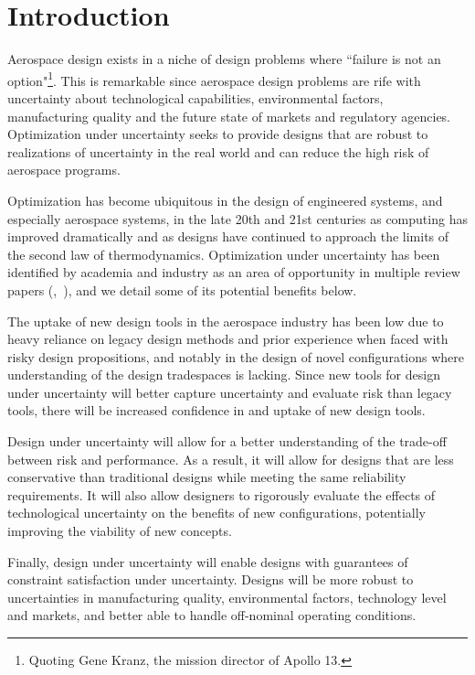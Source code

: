\section{Introduction}

Aerospace design exists in a niche of design problems where ``failure is
not an option"\footnote{Quoting Gene Kranz, the mission director of Apollo 13.}.
This is remarkable since aerospace design problems are rife with uncertainty about
technological capabilities, environmental factors, manufacturing quality and the future
state of markets and regulatory agencies.
Optimization under uncertainty seeks to provide designs that are robust
to realizations of uncertainty in the real world and can reduce
the high risk of aerospace programs.

Optimization has become ubiquitous in the design of engineered systems, and especially aerospace systems,
in the late 20th and 21st centuries as computing has improved dramatically and as designs have
continued to approach the limits of the second law of thermodynamics. Optimization under uncertainty
has been identified by academia and industry as an area of opportunity
in multiple review papers (\cite{Zang2002},~\cite{Yao2011}),
and we detail some of its potential benefits below.

{\color{blue} The uptake of new design tools in the aerospace industry has been low
due to heavy reliance on legacy design methods and prior experience when
faced with risky design propositions, and notably in
the design of novel configurations where understanding
of the design tradespaces is lacking. Since new tools for design under uncertainty
will better capture uncertainty and evaluate risk than legacy tools,
there will be increased confidence in and uptake of new design tools.

Design under uncertainty will allow for a better understanding of the trade-off between risk and
performance. As a result, it will allow for designs that are less conservative than
traditional designs while meeting the same reliability requirements. It will also allow
designers to rigorously evaluate the effects of
technological uncertainty on the benefits of new configurations,
potentially improving the viability of new concepts.

Finally, design under uncertainty will enable designs with guarantees
of constraint satisfaction under uncertainty. Designs
will be more robust to uncertainties in manufacturing quality,
environmental factors, technology level and markets, and better able to
handle off-nominal operating conditions.}


